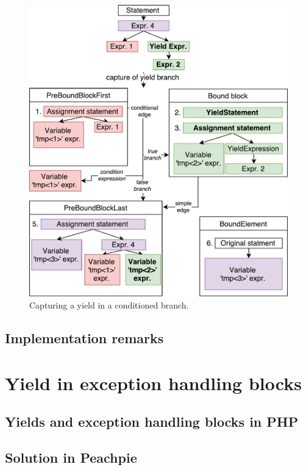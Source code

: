 \begin{figure}[h]
	\centering	
	\includegraphics[scale=0.75]{../img/5_3_yieldInCond}	
	\caption{Capturing a yield in a conditioned branch.}
	\label{fig5.3:YieldInCond}
\end{figure}

\subsection{Implementation remarks}

\section{Yield in exception handling blocks}

\subsection{Yields and exception handling blocks in PHP}

\subsection{Solution in Peachpie}

